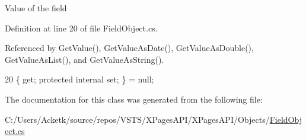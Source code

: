 Value of the field 



Definition at line 20 of file Field\+Object.\+cs.



Referenced by Get\+Value(), Get\+Value\+As\+Date(), Get\+Value\+As\+Double(), Get\+Value\+As\+List(), and Get\+Value\+As\+String().


\begin{DoxyCode}
20 \{ \textcolor{keyword}{get}; \textcolor{keyword}{protected} \textcolor{keyword}{internal} \textcolor{keyword}{set}; \} = null;
\end{DoxyCode}


The documentation for this class was generated from the following file\+:\begin{DoxyCompactItemize}
\item 
C\+:/\+Users/\+Acketk/source/repos/\+V\+S\+T\+S/\+X\+Pages\+A\+P\+I/\+X\+Pages\+A\+P\+I/\+Objects/\mbox{\hyperlink{_field_object_8cs}{Field\+Object.\+cs}}\end{DoxyCompactItemize}
